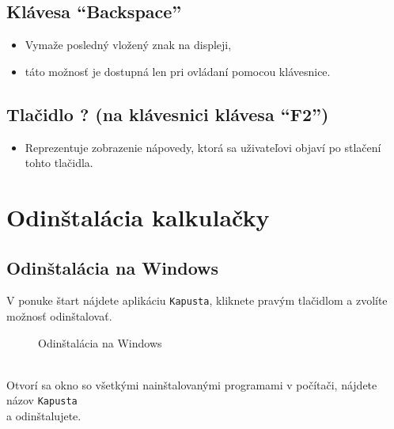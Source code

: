 \documentclass[a4paper, 11pt]{article}
\begin{document}
        \subsection{Klávesa “Backspace”}
        \begin{itemize}
            \item Vymaže posledný vložený znak na displeji,
            \item táto možnosť je dostupná len pri ovládaní pomocou klávesnice.
        \end{itemize}
        
        \subsection{Tlačidlo ? (na klávesnici klávesa “F2”)}
        \begin{itemize}
            \item Reprezentuje zobrazenie nápovedy, ktorá sa uživateľovi objaví po stlačení tohto tlačidla.
        \end{itemize}

        \newpage
        
         
        \section{Odinštalácia kalkulačky}
            \subsection{Odinštalácia na Windows}
                V ponuke štart nájdete aplikáciu \verb|Kapusta|, kliknete pravým tlačidlom a zvolíte možnosť odinštalovať.
                \begin{figure}[h]
                        \centering
                            \caption{Odinštalácia na Windows}
                    \end{figure}
                \\
                Otvorí sa okno so všetkými nainštalovanými programami v počítači, nájdete názov \verb|Kapusta|\\ a odinštalujete.
\end{document}
